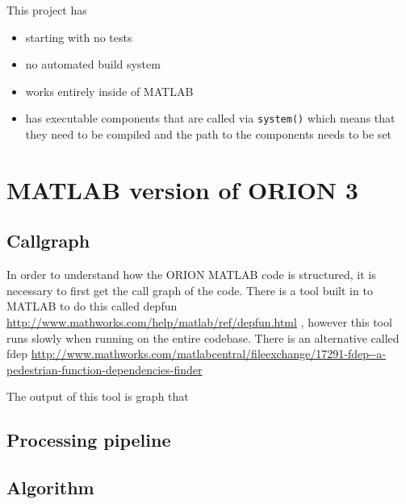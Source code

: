 
This project has

\begin{itemize}
\item starting with no tests
\item no automated build system
\item works entirely inside of MATLAB
\item has executable components that are called via \texttt{system()} which
	means that they need to be compiled and the path to the components
	needs to be set
\end{itemize}

\section{MATLAB version of ORION 3}


\subsection{Callgraph}

In order to understand how the ORION MATLAB code is structured, it
is necessary to first get the call graph of the code. There is a
tool built in to MATLAB to do this called
depfun
\url{http://www.mathworks.com/help/matlab/ref/depfun.html} %
, however this tool runs slowly when running on the entire codebase.
There is an alternative called fdep
\url{http://www.mathworks.com/matlabcentral/fileexchange/17291-fdep--a-pedestrian-function-dependencies-finder}

The output of this tool is graph that %



\resizebox{1.0\textwidth}{!}{}

\resizebox{1.0\textwidth}{!}{}

\resizebox{1.0\textwidth}{!}{}

%

\subsection{Processing pipeline}

\subsection{Algorithm}


